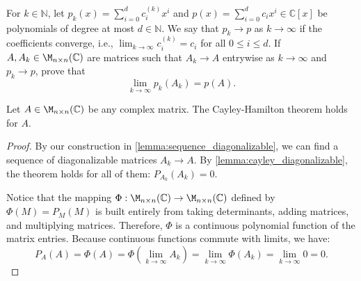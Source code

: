 \begin{exercise}
  \label{exc:convergence_of_matrix_polynomials}
  For $k \in \mathbb{N}$, let $p_k(x) = \sum_{i=0}^d c_i^{(k)} x^i$ and $p(x) = \sum_{i=0}^d c_i x^i \in \mathbb{C}[x]$ be polynomials of degree at most $d \in \mathbb{N}$. We say that $p_k \to p$ as $k \to \infty$ if the coefficients converge, i.e., $\lim_{k \to \infty} c_i^{(k)} = c_i$ for all $0 \le i \le d$.
  If $A, A_k \in \M_{n \times n}(\mathbb{C})$ are matrices such that $A_k \to A$ entrywise as $k \to \infty$ and $p_k \to p$, prove that
  \[
  \lim_{k \to \infty} p_k(A_k) = p(A).
  \]
\end{exercise}

\begin{lemma}
  \label{lemma:cayley_C}
  Let $A \in \M_{n \times n}(\mathbb{C})$ be any complex matrix. The Cayley-Hamilton theorem holds for $A$.
\end{lemma}

\begin{proof}
  By our construction in \cref{lemma:sequence_diagonalizable}, we can find a sequence of diagonalizable matrices $A_k \to A$. By \cref{lemma:cayley_diagonalizable}, the theorem holds for all of them: $P_{A_k}(A_k) = 0$.

  Notice that the mapping $\Phi: \M_{n \times n}(\mathbb{C}) \to \M_{n \times n}(\mathbb{C})$ defined by $\Phi(M) = P_M(M)$ is built entirely from taking determinants, adding matrices, and multiplying matrices. Therefore, $\Phi$ is a continuous polynomial function of the matrix entries. Because continuous functions commute with limits, we have:
  \[
  P_A(A) = \Phi(A) = \Phi\left(\lim_{k \to \infty} A_k\right) = \lim_{k \to \infty} \Phi(A_k) = \lim_{k \to \infty} 0 = 0.
  \]
\end{proof}


